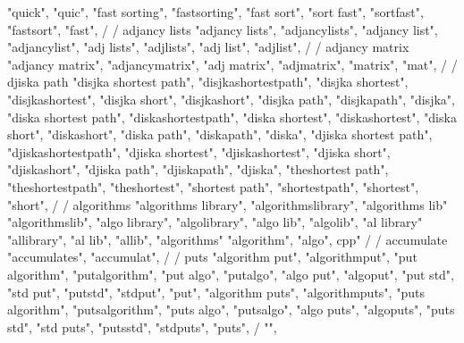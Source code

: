 {{{{{{{{{{{{{{{{        "quick",  
        "quic",  
        "fast sorting",  
        "fastsorting",  
        "fast sort",  
        "sort fast",  
        "sortfast",  
        "fastsort",  
        "fast",  
        /
        / adjancy lists
        "adjancy lists",  
        "adjancylists",  
        "adjancy list",  
        "adjancylist",  
        "adj lists",  
        "adjlists",  
        "adj list",  
        "adjlist",  
        /
        / adjancy matrix 
        "adjancy matrix",  
        "adjancymatrix",  
        "adj matrix",  
        "adjmatrix",  
        "matrix",  
        "mat",  
        /
        / djiska path 
        "disjka shortest path",  
        "disjkashortestpath",  
        "disjka shortest",  
        "disjkashortest",  
        "disjka short",  
        "disjkashort",  
        "disjka path",  
        "disjkapath",  
        "disjka",  
        "diska shortest path",  
        "diskashortestpath",  
        "diska shortest",  
        "diskashortest",  
        "diska short",  
        "diskashort",  
        "diska path",  
        "diskapath",  
        "diska",  
        "djiska shortest path",  
        "djiskashortestpath",  
        "djiska shortest",  
        "djiskashortest",  
        "djiska short",  
        "djiskashort",  
        "djiska path",  
        "djiskapath",  
        "djiska",  
        "theshortest path",  
        "theshortestpath",  
        "theshortest",  
        "shortest path",  
        "shortestpath",  
        "shortest",  
        "short",  
        /
        / algorithms 
        "algorithms library",
        "algorithmslibrary", 
        "algorithms lib"
        "algorithmslib",
        "algo library", 
        "algolibrary",
        "algo lib", 
        "algolib",
        "al library"
        "allibrary",
        "al lib",
        "allib",
        "algorithms"
        "algorithm",
        "algo", cpp"
        /
        / accumulate
        "accumulates",  
        "accumulat",  
        /
        / puts 
        "algorithm put",  
        "algorithmput",  
        "put algorithm",  
        "putalgorithm",  
        "put algo",  
        "putalgo",  
        "algo put",  
        "algoput",  
        "put std",  
        "std put",  
        "putstd",  
        "stdput",  
        "put",  
        "algorithm puts",  
        "algorithmputs",  
        "puts algorithm",  
        "putsalgorithm",  
        "puts algo",  
        "putsalgo",  
        "algo puts",  
        "algoputs",  
        "puts std",  
        "std puts",  
        "putsstd",  
        "stdputs",  
        "puts",  
        / {"", 
}}}}}}}}}}}}}}}}}
